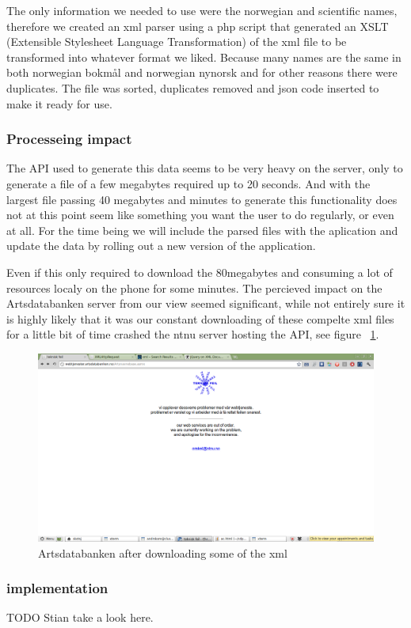 	The only information we needed to use were the norwegian and scientific names, therefore we created an xml parser using a php script that generated an XSLT (Extensible Stylesheet Language Transformation\cite{w3:xslt}) of the xml file to be transformed into whatever format we liked.
	Because many names are the same in both norwegian bokmål and norwegian nynorsk and for other reasons there were duplicates.
	The file was sorted, duplicates removed and json code inserted to make it ready for use.

	\subsubsection{Processeing impact}
	The API used to generate this data seems to be very heavy on the server, only to generate a file of a few megabytes required up to 20 seconds. 
	And with the largest file passing 40 megabytes and minutes to generate this functionality does not at this point seem like something you want the user to do regularly, or even at all. 
	For the time being we will include the parsed files with the aplication and update the data by rolling out a new version of the application.

	Even if this only required to download the 80megabytes and consuming a lot of resources localy on the phone for some minutes. 
	The percieved impact on the Artsdatabanken server from our view seemed significant, while not entirely sure it is highly likely that it was our constant downloading of these compelte xml files for a little bit of time crashed the ntnu server hosting the API, see figure ~\ref{fig:artsdatabanken_api}.

	\begin{figure}[htb]
	\centering
	\includegraphics[width=1\textwidth]{implementation/preparation/ntnu_server_artsdatabanken.png}
	\caption{Artsdatabanken after downloading some of the xml}
	\label{fig:artsdatabanken_api}
	\end{figure}

	\subsubsection{implementation}
		TODO Stian take a look here.


